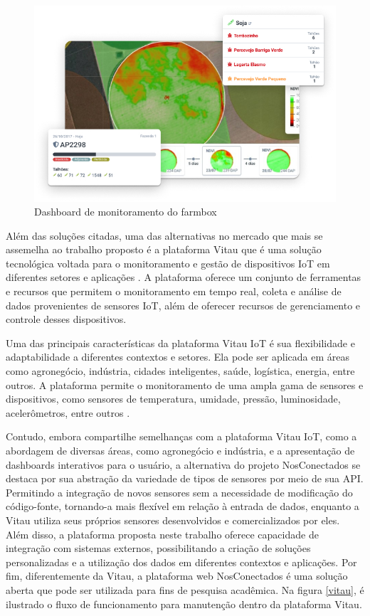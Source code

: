 \documentclass[tcc,capa]{texufpel}
\begin{document}
\begin{figure}[htbp]
  \centering \includegraphics[scale=.7]{assets/farmbox.jpg}
  \caption{Dashboard de monitoramento do farmbox}
  \label{farmbox}
\end{figure}
Além das soluções citadas, uma das alternativas no mercado que mais se assemelha ao trabalho proposto é a plataforma Vitau que é uma solução tecnológica voltada para o monitoramento e gestão de dispositivos IoT em diferentes setores e aplicações \cite{vitau:2023}. A plataforma oferece um conjunto de ferramentas e recursos que permitem o monitoramento em tempo real, coleta e análise de dados provenientes de sensores IoT, além de oferecer recursos de gerenciamento e controle desses dispositivos.

Uma das principais características da plataforma Vitau IoT é sua flexibilidade e adaptabilidade a diferentes contextos e setores. Ela pode ser aplicada em áreas como agronegócio, indústria, cidades inteligentes, saúde, logística, energia, entre outros. A plataforma permite o monitoramento de uma ampla gama de sensores e dispositivos, como sensores de temperatura, umidade, pressão, luminosidade, acelerômetros, entre outros \cite{vitau:2023}.

Contudo, embora compartilhe semelhanças com a plataforma Vitau IoT, como a abordagem de diversas áreas, como agronegócio e indústria, e a apresentação de dashboards interativos para o usuário, a alternativa do projeto NosConectados se destaca por sua abstração da variedade de tipos de sensores por meio de sua API. Permitindo a integração de novos sensores sem a necessidade de modificação do código-fonte, tornando-a mais flexível em relação à entrada de dados, enquanto a Vitau utiliza seus próprios sensores desenvolvidos e comercializados por eles. Além disso, a plataforma proposta neste trabalho oferece capacidade de integração com sistemas externos, possibilitando a criação de soluções personalizadas e a utilização dos dados em diferentes contextos e aplicações. Por fim, diferentemente da Vitau, a plataforma web NosConectados é uma solução aberta que pode ser utilizada para fins de pesquisa acadêmica. Na figura \ref{vitau}, é ilustrado o fluxo de funcionamento para manutenção dentro da plataforma Vitau.
\end{document}

